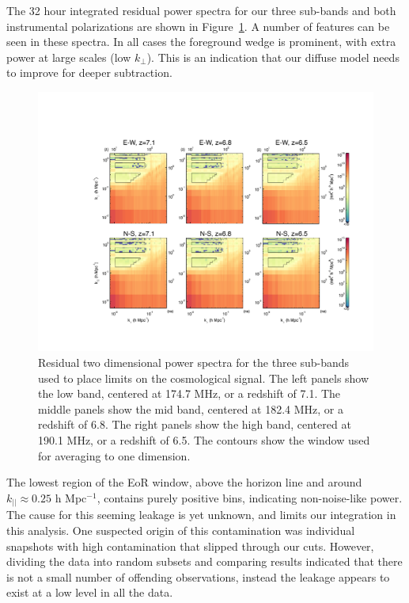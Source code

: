 \documentclass[iop]{emulateapj}
\begin{document}
The 32 hour integrated residual power spectra for our three sub-bands and both 
instrumental polarizations are shown in Figure~\ref{fig:2d_ps_subband}. A number of 
features can be seen in these spectra. In all cases the foreground wedge is prominent, with 
extra power at large scales (low $k_{\perp}$). This is an indication that our diffuse model needs to 
improve for deeper subtraction. 

\begin{figure}
\begin{center}
\includegraphics[width=\textwidth]{2d_res.pdf}
\caption[Deep 2D sub-band power spectra]{
Residual two dimensional power spectra for the three sub-bands used to place limits on the 
cosmological signal. The left panels show the low band, centered at 174.7 MHz, or a 
redshift of 7.1. The middle panels show the mid band, centered at 182.4 MHz, or a redshift 
of 6.8. The right panels show the high band, centered at 190.1 MHz, or a redshift of 6.5. 
The contours show the window used for averaging to one dimension.
\label{fig:2d_ps_subband}
}
\end{center}
\end{figure}

The lowest region of the EoR window, above the horizon line and around $k_{||} \approx 
0.25$ h Mpc$^{-1}$, contains purely positive bins, indicating non-noise-like power. The 
cause for this seeming leakage is yet unknown, and limits our integration in this 
analysis. One suspected origin of this contamination was individual snapshots with high 
contamination that slipped through our cuts. However, dividing the data into random 
subsets and comparing results indicated that there is not a small number of offending 
observations, instead the leakage appears to exist at a low level in all the data.
\end{document}
